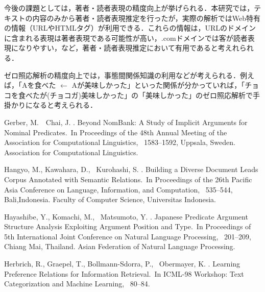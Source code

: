 \documentclass[japanese]{jnlp_1.4}
\begin{document}
今後の課題としては，著者・読者表現の精度向上が挙げられる．本研究では，テキストの内容のみから著者・読者表現推定を行ったが，実際の解析ではWeb特有の情報（URLやHTMLタグ）が利用できる．これらの情報は，URLのドメインに含まれる表現は著者表現である可能性が高い，.comドメインでは客が読者表現になりやすい，など，著者・読者表現推定において有用であると考えれられる．

ゼロ照応解析の精度向上では，事態間関係知識の利用などが考えられる．例えば，「Aを食べた $\leftarrow$ Aが美味しかった」といった関係が分かっていれば，「チョコを食べたが(チョコガ)美味しかった」の「美味しかった」のゼロ照応解析で手掛かりになると考えられる．
\vspace{-0.5\Cvs}



\begin{thebibliography}{}

Gerber, M.\BBACOMMA\ \BBA\ Chai, J. \BBCP.
\newblock \BBOQ Beyond NomBank: A Study of Implicit Arguments for Nominal
  Predicates.\BBCQ\
\newblock In {\Bem Proceedings of the 48th Annual Meeting of the Association
  for Computational Linguistics}, \mbox{\BPGS\ 1583--1592}, Uppsala, Sweden.
  Association for Computational Linguistics.

Hangyo, M., Kawahara, D., \BBA\ Kurohashi, S. \BBOP 2012\BBCP.
\newblock \BBOQ Building a Diverse Document Leads Corpus Annotated with
  Semantic Relations.\BBCQ\
\newblock In {\Bem Proceedings of the 26th Pacific Asia Conference on Language,
  Information, and Computation}, \mbox{\BPGS\ 535--544}, Bali,Indonesia.
  Faculty of Computer Science, Universitas Indonesia.

Hayashibe, Y., Komachi, M., \BBA\ Matsumoto, Y. \BBCP.
\newblock \BBOQ Japanese Predicate Argument Structure Analysis Exploiting
  Argument Position and Type.\BBCQ\
\newblock In {\Bem Proceedings of 5th International Joint Conference on Natural
  Language Processing}, \mbox{\BPGS\ 201--209}, Chiang Mai, Thailand. Asian
  Federation of Natural Language Processing.

Herbrich, R., Graepel, T., Bollmann-Sdorra, P., \BBA\ Obermayer, K. \BBOP
  1998\BBCP.
\newblock \BBOQ Learning Preference Relations for Information Retrieval.\BBCQ\
\newblock In {\Bem ICML-98 Workshop: Text Categorization and Machine Learning},
  \mbox{\BPGS\ 80--84}.


\end{thebibliography}
\end{document}
